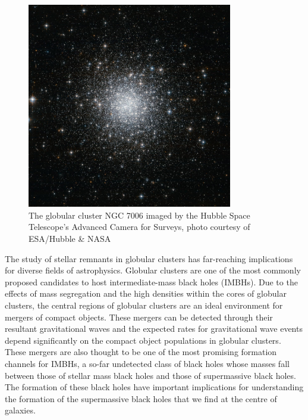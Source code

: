\begin{figure}
	\centering
	\includegraphics[width=0.8\textwidth]{figures/c42.jpg}
	\caption{The globular cluster NGC 7006 imaged by the Hubble Space Telescope's Advanced
		Camera for Surveys, photo courtesy of ESA/Hubble \& NASA}
	\label{fig:1/ngc7006}
\end{figure}



The study of stellar remnants in globular clusters has far-reaching implications for diverse fields
of astrophysics. Globular clusters are one of the most commonly proposed candidates to host
intermediate-mass black holes (IMBHs). Due to  the effects of mass segregation and the high
densities within the cores of globular clusters, the central regions of globular clusters are an
ideal environment for mergers of compact objects. These mergers can be detected through their
resultant gravitational waves and the expected rates for gravitational wave events depend
significantly on the compact object populations in globular clusters. These mergers are also thought
to be one of the most promising formation channels for IMBHs, a so-far undetected class of black
holes whose masses fall between those of stellar mass black holes and those of supermassive black
holes. The formation of these black holes have important implications for understanding the
formation of the supermassive black holes that we find at the centre of galaxies.


